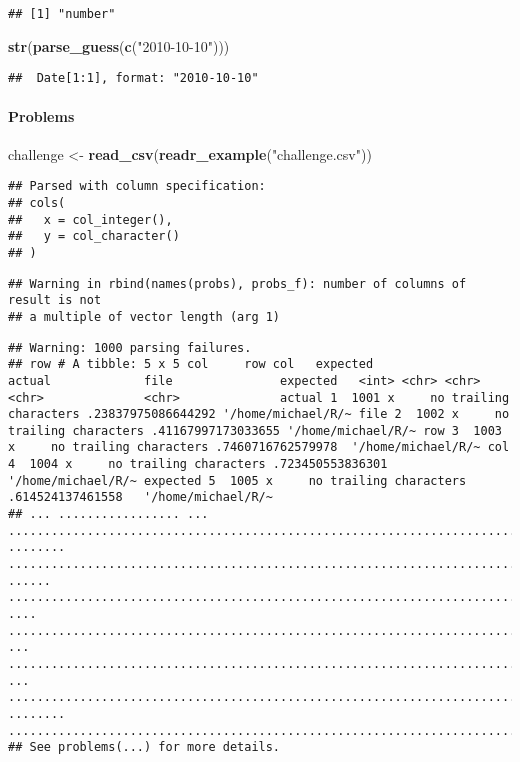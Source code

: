 \documentclass[]{article}
\newenvironment{Shaded}{\begin{snugshade}}{\end{snugshade}}
\newcommand{\KeywordTok}[1]{\textcolor[rgb]{0.13,0.29,0.53}{\textbf{#1}}}
\newcommand{\StringTok}[1]{\textcolor[rgb]{0.31,0.60,0.02}{#1}}
\newcommand{\NormalTok}[1]{#1}
\let\oldparagraph\paragraph
\renewcommand{\paragraph}[1]{\oldparagraph{#1}\mbox{}}
\begin{document}
\begin{verbatim}
## [1] "number"
\end{verbatim}

\begin{Shaded}
\begin{Highlighting}[]
\KeywordTok{str}\NormalTok{(}\KeywordTok{parse_guess}\NormalTok{(}\KeywordTok{c}\NormalTok{(}\StringTok{"2010-10-10"}\NormalTok{)))}
\end{Highlighting}
\end{Shaded}

\begin{verbatim}
##  Date[1:1], format: "2010-10-10"
\end{verbatim}

\paragraph{Problems}\label{problems}

\begin{Shaded}
\begin{Highlighting}[]
\NormalTok{challenge <-}\StringTok{ }\KeywordTok{read_csv}\NormalTok{(}\KeywordTok{readr_example}\NormalTok{(}\StringTok{"challenge.csv"}\NormalTok{))}
\end{Highlighting}
\end{Shaded}

\begin{verbatim}
## Parsed with column specification:
## cols(
##   x = col_integer(),
##   y = col_character()
## )
\end{verbatim}

\begin{verbatim}
## Warning in rbind(names(probs), probs_f): number of columns of result is not
## a multiple of vector length (arg 1)
\end{verbatim}

\begin{verbatim}
## Warning: 1000 parsing failures.
## row # A tibble: 5 x 5 col     row col   expected               actual             file               expected   <int> <chr> <chr>                  <chr>              <chr>              actual 1  1001 x     no trailing characters .23837975086644292 '/home/michael/R/~ file 2  1002 x     no trailing characters .41167997173033655 '/home/michael/R/~ row 3  1003 x     no trailing characters .7460716762579978  '/home/michael/R/~ col 4  1004 x     no trailing characters .723450553836301   '/home/michael/R/~ expected 5  1005 x     no trailing characters .614524137461558   '/home/michael/R/~
## ... ................. ... .......................................................................... ........ .......................................................................... ...... .......................................................................... .... .......................................................................... ... .......................................................................... ... .......................................................................... ........ ..........................................................................
## See problems(...) for more details.
\end{verbatim}
\end{document}

